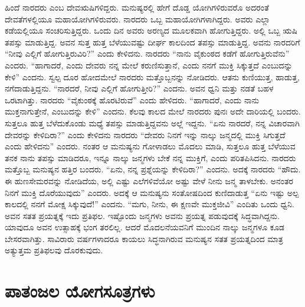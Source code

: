 ಹಿಂದೆ ನಾರದರು ಎಂಬ ದೇವಋಷಿಗಳಿದ್ದರು. ಮನುಷ್ಯರಲ್ಲಿ ಹೇಗೆ ದೊಡ್ಡ ಯೋಗಿಗಳಿರುವರೊ ಅದರಂತೆ ದೇವತೆಗಳಲ್ಲಿಯೂ ಮಹಾಯೋಗಿಗಳಿರುವರು. ನಾರದರು ಒಬ್ಬ ಮಹಾಯೋಗಿಗಳಾಗಿದ್ದರು. ಅವರು ಎಲ್ಲಾ ಕಡೆಯಲ್ಲಿಯೂ ಸಂಚರಿಸುತ್ತಿದ್ದರು. ಒಂದು ದಿನ ಅವರು ಅರಣ್ಯದ ಮೂಲಕವಾಗಿ ಹೋಗುತ್ತಿದ್ದರು. ಅಲ್ಲಿ ಒಬ್ಬ ಋಷಿ ತಪಸ್ಸು ಮಾಡುತ್ತಿದ್ದ. ಅವನ ಸುತ್ತ ಹುತ್ತ ಬೆಳೆಯುವಷ್ಟು ದೀರ್ಘ ಕಾಲದಿಂದ ತಪಸ್ಸು ಮಾಡುತ್ತಿದ್ದ. ಅವನು ನಾರದರಿಗೆ “ನೀವು ಎಲ್ಲಿಗೆ ಹೋಗುತ್ತಿರುವಿರಿ?” ಎಂದು ಕೇಳಿದನು. ನಾರದರು “ನಾನು ವೈಕುಂಠದ ಕಡೆಗೆ ಹೋಗುತ್ತಿರುವೆನು” ಎಂದರು. “ಹಾಗಾದರೆ, ಎಂದು ದೇವರು ನನ್ನ ಮೇಲೆ ಕರುಣಿಸುತ್ತಾನೆ, ಎಂದು ನನಗೆ ಮುಕ್ತಿ ಸಿಕ್ಕುತ್ತದೆ ಎಂಬುದನ್ನು ಕೇಳಿ” ಎಂದನು. ಸ್ವಲ್ಪ ದೂರ ಹೋದಮೇಲೆ ನಾರದರು ಮತ್ತೊಬ್ಬನನ್ನು ನೋಡಿದರು. ಆತನು ಕುಣಿಯುತ್ತ, ಹಾಡುತ್ತ, ನಗೆದಾಡುತ್ತಿದ್ದನು. “ನಾರದರೆ, ನೀವು ಎಲ್ಲಿಗೆ ಹೋಗುತ್ತೀರಿ?” ಎಂದನು. ಅವನ ಧ್ವನಿ ಮತ್ತು ನಡತೆ ಬಹಳ ಒರಟಾಗಿತ್ತು. ನಾರದರು “ವೈಕುಂಠಕ್ಕೆ ಹೊರಟಿರುವೆ” ಎಂದು ಹೇಳಿದರು. “ಹಾಗಾದರೆ, ಎಂದು ನಾನು ಮುಕ್ತನಾಗುತ್ತೇನೆ, ಎಂಬುದನ್ನು ಕೇಳಿ” ಎಂದನು. ಕೆಲವು ಕಾಲದ ಮೇಲೆ ನಾರದರು ಪುನಃ ಅದೇ ದಾರಿಯಲ್ಲಿ ಬಂದರು. ಸುತ್ತಲೂ ಹುತ್ತ ಬೆಳೆದುಕೊಂಡು ಮಧ್ಯೆ ತಪಸ್ಸು ಮಾಡುತ್ತಿದ್ದವನು ಅಲ್ಲೆ ಇದ್ದನು. “ಏನು ನಾರದರೆ, ನನ್ನ ವಿಚಾರವಾಗಿ ದೇವರನ್ನು ಕೇಳಿದಿರಾ?” ಎಂದು ಕೇಳಿದನು ನಾರದರು “ದೇವರು ನಿನಗೆ ಇನ್ನು ನಾಲ್ಕು ಜನ್ಮದಲ್ಲಿ ಮುಕ್ತಿ ಸಿಗುತ್ತದೆ ಎಂದು ಹೇಳಿದನು” ಎಂದರು. ನಂತರ ಆ ಮನುಷ್ಯನು ಗೋಳಾಡಲು ಮೊದಲು ಮಾಡಿ, ಸುತ್ತಲೂ ಹುತ್ತ ಬೆಳೆಯುವ ತನಕ ನಾನು ತಪಸ್ಸು ಮಾಡಿದರೂ, ಇನ್ನೂ ನಾಲ್ಕು ಜನ್ಮಗಳು ಬೇಕೆ ನನ್ನ ಮುಕ್ತಿಗೆ, ಎಂದು ಪರಿತಪಿಸಿದನು. ನಾರದರು ಮತ್ತೊಬ್ಬ ಮನುಷ್ಯನ ಹತ್ತಿರ ಬಂದರು. “ಏನು, ನನ್ನ ಪ್ರಶ್ನೆಯನ್ನು ಕೇಳಿದಿರಾ?” ಎಂದನು. ಅದಕ್ಕೆ ನಾರದರು “ಹೌದು. ಈ ಹುಣಸೇಮರವನ್ನು ನೋಡಿದೆಯ, ಅಲ್ಲಿ ಎಷ್ಟು ಎಲೆಗಳಿವೆಯೋ ಅಷ್ಟು ವೇಳೆ ನೀನು ಜನ್ಮ ತಾಳಬೇಕು. ಅನಂತರ ನಿನಗೆ ಮುಕ್ತಿ ದೊರೆಯುವುದು” ಎಂದರು. ಅದಕ್ಕೆ ಆ ಮನುಷ್ಯನು ಸಂತೋಷದಿಂದ ಕುಣಿದಾಡುತ್ತ “ಏನು ಇಷ್ಟು ಅಲ್ಪ ಕಾಲದಲ್ಲಿ ನನಗೆ ಮೋಕ್ಷ ಸಿಕ್ಕುವುದೆ!” ಎಂದನು. “ಮಗು, ನೀನು, ಈ ಕ್ಷಣವೇ ಮುಕ್ತಜೀವಿ” ಎಂದಿತು ಒಂದು ಧ್ವನಿ. ಅವನ ಸತತ ಪ್ರಯತ್ನಕ್ಕೆ ಇದು ಪ್ರತಿಫಲ. ಇಷ್ಟೊಂದು ಜನ್ಮಗಳು ಅವನು ಪ್ರಯತ್ನ ಪಡುವುದಕ್ಕೆ ಸಿದ್ಧವಾಗಿದ್ದನು. ಯಾವುದೂ ಅವನ ಉತ್ಸಾಹಕ್ಕೆ ಭಂಗ ತರಲಿಲ್ಲ. ಆದರೆ ಮೊದಲನೆಯವನಿಗೆ ಮುಂದಿನ ನಾಲ್ಕು ಜನ್ಮಗಳೂ ಕೂಡ ಬೇಸರವಾಗಿತ್ತು. ಸಾವಿರಾರು ವರ್ಷಗಳಾದರೂ ಕಾಯಲು ಸಿದ್ಧನಾಗಿರುವ ಮನುಷ್ಯನ ಸತತ ಪ್ರಯತ್ನದಿಂದ ಮಾತ್ರ ಅತ್ಯುತ್ತಮ ಪ್ರತಿಫಲವು ದೊರಕುವುದು.

\chapter[ಪೀಠಿಕೆ : ಪಾತಂಜಲ ಯೋಗಸೂತ್ರಗಳು]{ಪಾತಂಜಲ ಯೋಗಸೂತ್ರಗಳು}


